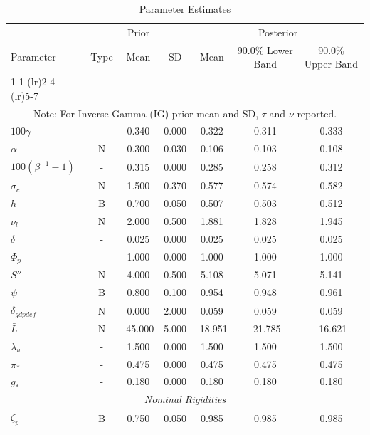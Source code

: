\documentclass[12pt]{article}
\begin{document}
\pagestyle{empty}
\vspace*{.5cm}
{\small
\begin{longtable}{lcccccc}
\caption{Parameter Estimates}
\\ \hline
\multicolumn{1}{c}{} & \multicolumn{3}{c}{Prior} & \multicolumn{3}{c}{Posterior} \\
Parameter & Type & Mean & SD & Mean & 90.0\% {\tiny Lower Band} & 90.0\% {\tiny Upper Band} \\
\cmidrule(lr){1-1} \cmidrule(lr){2-4} \cmidrule(lr){5-7}
\endhead
\hline
\\ \multicolumn{7}{c}{\footnotesize Note: For Inverse Gamma (IG) prior mean and SD, $\tau$ and $\nu$ reported.}
\endfoot
\multicolumn{7}{c}{\textit{Steady State}} \\[3pt]
$100\gamma$ & - &    0.340 &    0.000 &    0.322 &    0.311 &    0.333 \\
$\alpha$ & N &    0.300 &    0.030 &    0.106 &    0.103 &    0.108 \\
$100(\beta^{-1} - 1)$ & - &    0.315 &    0.000 &    0.285 &    0.258 &    0.312 \\
$\sigma_{c}$ & N &    1.500 &    0.370 &    0.577 &    0.574 &    0.582 \\
$   h$ & B &    0.700 &    0.050 &    0.507 &    0.503 &    0.512 \\
$\nu_l$ & N &    2.000 &    0.500 &    1.881 &    1.828 &    1.945 \\
$\delta$ & - &    0.025 &    0.000 &    0.025 &    0.025 &    0.025 \\
$\Phi_p$ & - &    1.000 &    0.000 &    1.000 &    1.000 &    1.000 \\
$ S''$ & N &    4.000 &    0.500 &    5.108 &    5.071 &    5.141 \\
$\psi$ & B &    0.800 &    0.100 &    0.954 &    0.948 &    0.961 \\
$\delta_{gdpdef}$ & N &    0.000 &    2.000 &    0.059 &    0.059 &    0.059 \\
$\bar{L}$ & N &  -45.000 &    5.000 &  -18.951 &  -21.785 &  -16.621 \\
$\lambda_w$ & - &    1.500 &    0.000 &    1.500 &    1.500 &    1.500 \\
$\pi_*$ & - &    0.475 &    0.000 &    0.475 &    0.475 &    0.475 \\
$ g_*$ & - &    0.180 &    0.000 &    0.180 &    0.180 &    0.180 \\
\multicolumn{7}{c}{\textit{Nominal Rigidities}} \\[3pt]
$\zeta_p$ & B &    0.750 &    0.050 &    0.985 &    0.985 &    0.985 \\

\end{longtable}}
\end{document}
